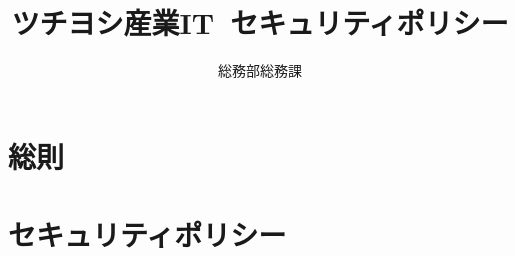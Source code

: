 \documentclass[uplatex, a4j, onecolumn, 12pt, dvipdfmx]{jsbook}
\title{\Large ツチヨシ産業IT~セキュリティポリシー}
\author{総務部総務課}
\date{\rightline{\today}}
\begin{document}
\maketitle
\setcounter{page}{1}
\tableofcontents
\clearpage
{}
\setcounter{page}{1}

\part*{総則}

\part{セキュリティポリシー} \label{セキュリティポリシー}












\renewcommand{\appendixname}{補遺}
\appendix

\end{document}
